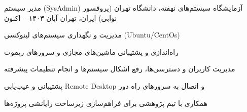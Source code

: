 

\begin{cventries}

  \cventry
    {مدیر سیستم (SysAdmin)} %
    {آزمایشگاه سیستم‌های نهفته، دانشگاه تهران (پروفسور نوابی)} %
    {ایران، تهران} %
    {آبان ۱۴۰۳ – اکنون} %
    {
      \begin{cvitems}
        \item {مدیریت و نگهداری سیستم‌های لینوکسی (Ubuntu/CentOs)}
        \item {راه‌اندازی و پشتیبانی ماشین‌های مجازی و سرورهای ریموت}
        \item {مدیریت کاربران و دسترسی‌ها، رفع اشکال سیستم‌ها و انجام تنظیمات پیشرفته}
        \item {پشتیبانی و عیب‌یابی Remote Desktop و اتصال به سرورهای راه دور}
        \item {همکاری با تیم پژوهشی برای فراهم‌سازی زیرساخت رایانشی پروژه‌ها}
      \end{cvitems}
    }
  
\end{cventries}
